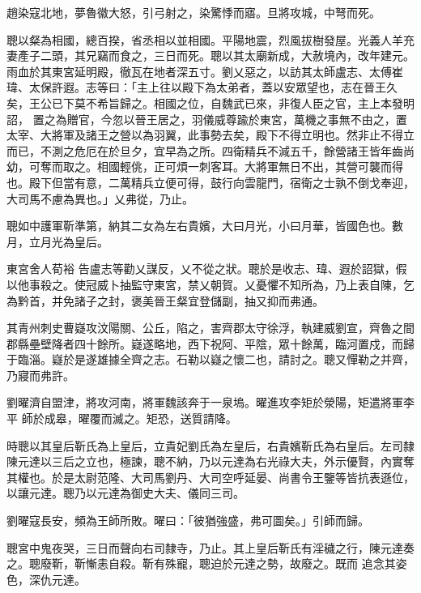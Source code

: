 \begin{pinyinscope}
 趙染寇北地，夢魯徽大怒，引弓射之，染驚悸而寤。旦將攻城，中弩而死。



 聰以粲為相國，總百揆，省丞相以並相國。平陽地震，烈風拔樹發屋。光義人羊充妻產子二頭，其兄竊而食之，三日而死。聰以其太廟新成，大赦境內，改年建元。雨血於其東宮延明殿，徹瓦在地者深五寸。劉乂惡之，以訪其太師盧志、太傅崔瑋、太保許遐。志等曰：「主上往以殿下為太弟者，蓋以安眾望也，志在晉王久矣，王公已下莫不希旨歸之。相國之位，自魏武已來，非復人臣之官，主上本發明詔，
 置之為贈官，今忽以晉王居之，羽儀威尊踰於東宮，萬機之事無不由之，置太宰、大將軍及諸王之營以為羽翼，此事勢去矣，殿下不得立明也。然非止不得立而已，不測之危厄在於旦夕，宜早為之所。四衛精兵不減五千，餘營諸王皆年齒尚幼，可奪而取之。相國輕佻，正可煩一刺客耳。大將軍無日不出，其營可襲而得也。殿下但當有意，二萬精兵立便可得，鼓行向雲龍門，宿衛之士孰不倒戈奉迎，大司馬不慮為異也。」乂弗從，乃止。



 聰如中護軍靳準第，納其二女為左右貴嬪，大曰月光，小曰月華，皆國色也。數月，立月光為皇后。



 東宮舍人荀裕
 告盧志等勸乂謀反，乂不從之狀。聰於是收志、瑋、遐於詔獄，假以他事殺之。使冠威卜抽監守東宮，禁乂朝賀。乂憂懼不知所為，乃上表自陳，乞為黔首，并免諸子之封，褒美晉王粲宜登儲副，抽又抑而弗通。



 其青州刺史曹嶷攻汶陽關、公丘，陷之，害齊郡太守徐浮，執建威劉宣，齊魯之間郡縣壘壁降者四十餘所。嶷遂略地，西下祝阿、平陰，眾十餘萬，臨河置戍，而歸于臨淄。嶷於是遂雄據全齊之志。石勒以嶷之懷二也，請討之。聰又憚勒之并齊，乃寢而弗許。



 劉曜濟自盟津，將攻河南，將軍魏該奔于一泉塢。曜進攻李矩於滎陽，矩遣將軍李平
 師於成皋，曜覆而滅之。矩恐，送質請降。



 時聰以其皇后靳氏為上皇后，立貴妃劉氏為左皇后，右貴嬪靳氏為右皇后。左司隸陳元達以三后之立也，極諫，聰不納，乃以元達為右光祿大夫，外示優賢，內實奪其權也。於是太尉范隆、大司馬劉丹、大司空呼延晏、尚書令王鑒等皆抗表遜位，以讓元達。聰乃以元達為御史大夫、儀同三司。



 劉曜寇長安，頻為王師所敗。曜曰：「彼猶強盛，弗可圖矣。」引師而歸。



 聰宮中鬼夜哭，三日而聲向右司隸寺，乃止。其上皇后靳氏有淫穢之行，陳元達奏之。聰廢靳，靳慚恚自殺。靳有殊寵，聰迫於元達之勢，故廢之。既而
 追念其姿色，深仇元達。




\end{pinyinscope}
